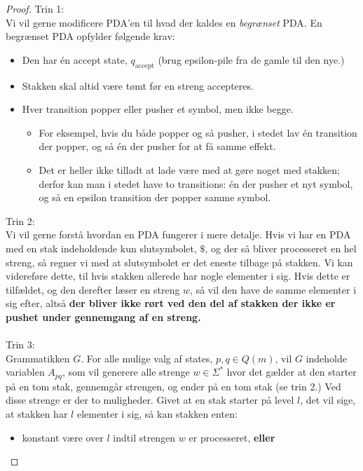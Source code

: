 \begin{proof}
	Trin 1:\\
	\noindent
	Vi vil gerne modificere PDA'en til hvad der kaldes en \textit{begrænset} PDA. En begrænset PDA opfylder følgende krav:
	\begin{itemize}
		\item Den har én accept state, $q_{\text{accept}}$ (brug epsilon-pile fra de gamle til den nye.)
		\item Stakken skal altid være tømt før en streng accepteres.
		\item Hver transition popper eller pusher et symbol, men ikke begge.
		      \begin{itemize}
			      \item For eksempel, hvis du både popper og så pusher, i stedet lav én transition der popper, og så én der pusher for at få samme effekt.
			      \item Det er heller ikke tilladt at lade være med at gøre noget med stakken; derfor kan man i stedet have to transitions: én der pusher et nyt symbol, og så en epsilon transition der popper samme symbol.
		      \end{itemize}
	\end{itemize}
	Trin 2:\\
	\noindent
	Vi vil gerne forstå hvordan en PDA fungerer i mere detalje. Hvis vi har en PDA med en stak indeholdende kun slutsymbolet, $\$$, og der så bliver processeret en hel streng, så regner vi med at slutsymbolet er det eneste tilbage på stakken. Vi kan videreføre dette, til hvis stakken allerede har nogle elementer i sig. Hvis dette er tilfældet, og den derefter læser en streng $w$, så vil den have de samme elementer i sig efter, altså \textbf{der bliver ikke rørt ved den del af stakken der ikke er pushet under gennemgang af en streng.}\\\\
	\noindent
	Trin 3:\\
	\noindent
	Grammatikken $G$. For alle mulige valg af states, $p, q \in Q(m)$, vil $G$ indeholde variablen $A_{pq}$, som vil generere alle strenge $w \in \Sigma^*$ hvor det gælder at den starter på en tom stak, gennemgår strengen, og ender på en tom stak (se trin 2.) Ved disse strenge er der to muligheder. Givet at en stak starter på level $l$, det vil sige, at stakken har $l$ elementer i sig, så kan stakken enten:
	\begin{itemize}
		\item konstant være over $l$ indtil strengen $w$ er processeret, \textbf{eller}

\end{itemize}
\end{proof}
